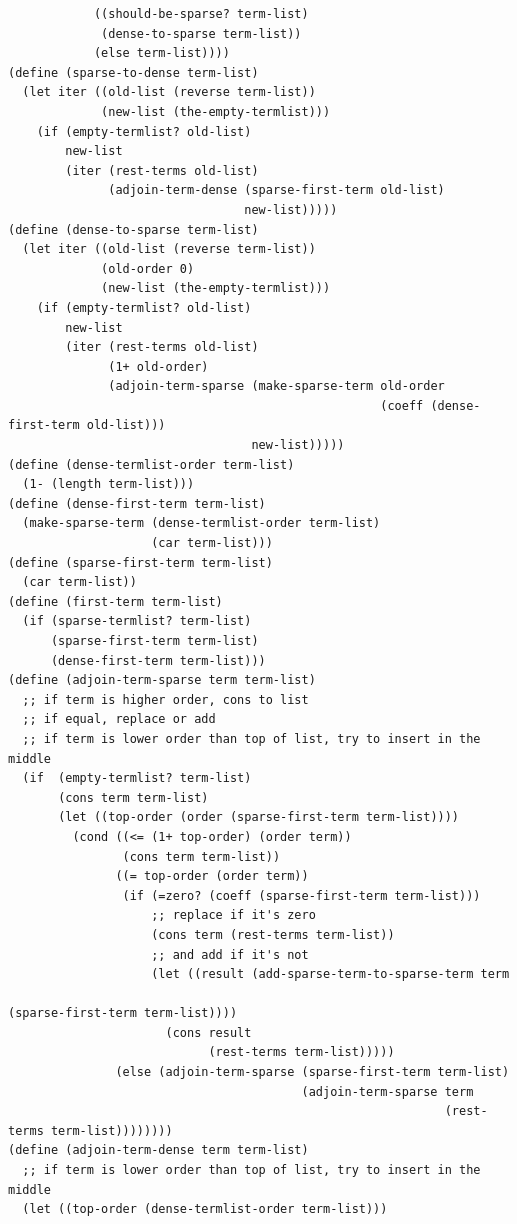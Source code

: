 \documentclass[final,fleqn,titlepage,twoside]{article}
\begin{document}
\begin{verbatim}
            ((should-be-sparse? term-list)
             (dense-to-sparse term-list))
            (else term-list))))
(define (sparse-to-dense term-list)
  (let iter ((old-list (reverse term-list))
             (new-list (the-empty-termlist)))
    (if (empty-termlist? old-list)
        new-list
        (iter (rest-terms old-list)
              (adjoin-term-dense (sparse-first-term old-list)
                                 new-list)))))
(define (dense-to-sparse term-list)
  (let iter ((old-list (reverse term-list))
             (old-order 0)
             (new-list (the-empty-termlist)))
    (if (empty-termlist? old-list)
        new-list
        (iter (rest-terms old-list)
              (1+ old-order)
              (adjoin-term-sparse (make-sparse-term old-order
                                                    (coeff (dense-first-term old-list)))
                                  new-list)))))
(define (dense-termlist-order term-list)
  (1- (length term-list)))
(define (dense-first-term term-list)
  (make-sparse-term (dense-termlist-order term-list)
                    (car term-list)))
(define (sparse-first-term term-list)
  (car term-list))
(define (first-term term-list)
  (if (sparse-termlist? term-list)
      (sparse-first-term term-list)
      (dense-first-term term-list)))
(define (adjoin-term-sparse term term-list)
  ;; if term is higher order, cons to list
  ;; if equal, replace or add
  ;; if term is lower order than top of list, try to insert in the middle
  (if  (empty-termlist? term-list)
       (cons term term-list)
       (let ((top-order (order (sparse-first-term term-list))))
         (cond ((<= (1+ top-order) (order term))
                (cons term term-list))
               ((= top-order (order term))
                (if (=zero? (coeff (sparse-first-term term-list)))
                    ;; replace if it's zero
                    (cons term (rest-terms term-list))
                    ;; and add if it's not
                    (let ((result (add-sparse-term-to-sparse-term term
                                                                  (sparse-first-term term-list))))
                      (cons result
                            (rest-terms term-list))))) 
               (else (adjoin-term-sparse (sparse-first-term term-list)
                                         (adjoin-term-sparse term
                                                             (rest-terms term-list))))))))
(define (adjoin-term-dense term term-list)
  ;; if term is lower order than top of list, try to insert in the middle
  (let ((top-order (dense-termlist-order term-list)))

\end{verbatim}
\end{document}
